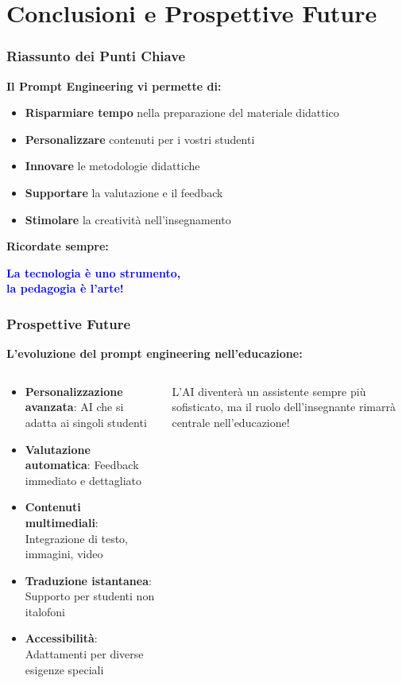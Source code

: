 \documentclass[aspectratio=169]{beamer}
\begin{document}
\section{Conclusioni e Prospettive Future}
%
%
\begin{frame}
\frametitle{Riassunto dei Punti Chiave}
\textbf{Il Prompt Engineering vi permette di:}
\begin{itemize}
    \item \textbf{Risparmiare tempo} nella preparazione del materiale didattico
    \item \textbf{Personalizzare} contenuti per i vostri studenti
    \item \textbf{Innovare} le metodologie didattiche
    \item \textbf{Supportare} la valutazione e il feedback
    \item \textbf{Stimolare} la creatività nell'insegnamento
\end{itemize}

\pause
\vspace{1cm}
\textbf{Ricordate sempre:}
\begin{center}
\Large
\textcolor{blue}{\textbf{La tecnologia è uno strumento,\\la pedagogia è l'arte!}}
\end{center}
\end{frame}
%
%
\begin{frame}
\frametitle{Prospettive Future}
\textbf{L'evoluzione del prompt engineering nell'educazione:}

\begin{columns}
\begin{column}{0.6\textwidth}
\begin{itemize}
    \item \textbf{Personalizzazione avanzata}: AI che si adatta ai singoli studenti
    \item \textbf{Valutazione automatica}: Feedback immediato e dettagliato
    \item \textbf{Contenuti multimediali}: Integrazione di testo, immagini, video
    \item \textbf{Traduzione istantanea}: Supporto per studenti non italofoni
    \item \textbf{Accessibilità}: Adattamenti per diverse esigenze speciali
\end{itemize}
\end{column}
\begin{column}{0.4\textwidth}
\begin{tipbox}[Il Futuro]
L'AI diventerà un assistente sempre più sofisticato, ma il ruolo dell'insegnante rimarrà centrale nell'educazione!
\end{tipbox}
\end{column}
\end{columns}
\end{frame}
\end{document}

